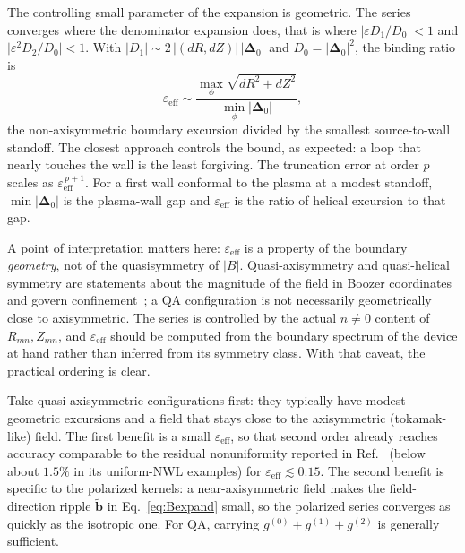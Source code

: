 \documentclass[11pt]{article}
\newcommand{\Del}{\bm{\Delta}}
\newcommand{\bperp}{\tilde{\bm{b}}}
\newcommand{\eps}{\varepsilon}
\begin{document}
The controlling small parameter of the expansion is geometric. The series converges where the denominator expansion does, that is where $\lvert\eps D_1/D_0\rvert<1$ and $\lvert\eps^2 D_2/D_0\rvert<1$. With $\lvert D_1\rvert\sim 2\,\lvert(dR,dZ)\rvert\,\lvert\Del_0\rvert$ and $D_0=\lvert\Del_0\rvert^2$, the binding ratio is
\begin{equation}
\eps_{\mathrm{eff}}\sim\frac{\max_\phi\sqrt{dR^2+dZ^2}}{\min_\phi\lvert\Del_0\rvert},
\label{eq:epseff}
\end{equation}
the non-axisymmetric boundary excursion divided by the smallest source-to-wall standoff. The closest approach controls the bound, as expected: a loop that nearly touches the wall is the least forgiving. The truncation error at order $p$ scales as $\eps_{\mathrm{eff}}^{\,p+1}$. For a first wall conformal to the plasma at a modest standoff, $\min\lvert\Del_0\rvert$ is the plasma-wall gap and $\eps_{\mathrm{eff}}$ is the ratio of helical excursion to that gap.

A point of interpretation matters here: $\eps_{\mathrm{eff}}$ is a property of the boundary \emph{geometry}, not of the quasisymmetry of $\lvert B\rvert$. Quasi-axisymmetry and quasi-helical symmetry are statements about the magnitude of the field in Boozer coordinates and govern confinement~\cite{boozer1983,nuhrenberg1988,landreman2022,helander2014}; a QA configuration is not necessarily geometrically close to axisymmetric. The series is controlled by the actual $n\neq0$ content of $R_{mn},Z_{mn}$, and $\eps_{\mathrm{eff}}$ should be computed from the boundary spectrum of the device at hand rather than inferred from its symmetry class. With that caveat, the practical ordering is clear.

Take quasi-axisymmetric configurations first: they typically have modest geometric excursions and a field that stays close to the axisymmetric (tokamak-like) field. The first benefit is a small $\eps_{\mathrm{eff}}$, so that second order already reaches accuracy comparable to the residual nonuniformity reported in Ref.~\cite{schwartz2025} (below about $1.5\%$ in its uniform-NWL examples) for $\eps_{\mathrm{eff}}\lesssim0.15$. The second benefit is specific to the polarized kernels: a near-axisymmetric field makes the field-direction ripple $\bperp$ in Eq.~\eqref{eq:Bexpand} small, so the polarized series converges as quickly as the isotropic one. For QA, carrying $g^{(0)}+g^{(1)}+g^{(2)}$ is generally sufficient.
\end{document}
